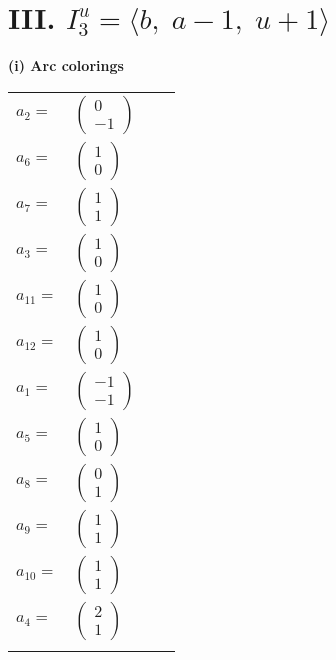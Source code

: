 \documentclass[1p]{elsarticle_modified}
\theoremstyle{definition}
\begin{document}
\centering \section*{III. $I^u_{3}= \langle b,\;a-1,\;u+1 \rangle$}
\flushleft \textbf{(i) Arc colorings}\\
\begin{tabular}{m{7pt} m{180pt} m{7pt} m{180pt} }
\flushright $a_{2}=$&$\begin{pmatrix}0\\-1\end{pmatrix}$ \\
\flushright $a_{6}=$&$\begin{pmatrix}1\\0\end{pmatrix}$ \\
\flushright $a_{7}=$&$\begin{pmatrix}1\\1\end{pmatrix}$ \\
\flushright $a_{3}=$&$\begin{pmatrix}1\\0\end{pmatrix}$ \\
\flushright $a_{11}=$&$\begin{pmatrix}1\\0\end{pmatrix}$ \\
\flushright $a_{12}=$&$\begin{pmatrix}1\\0\end{pmatrix}$ \\
\flushright $a_{1}=$&$\begin{pmatrix}-1\\-1\end{pmatrix}$ \\
\flushright $a_{5}=$&$\begin{pmatrix}1\\0\end{pmatrix}$ \\
\flushright $a_{8}=$&$\begin{pmatrix}0\\1\end{pmatrix}$ \\
\flushright $a_{9}=$&$\begin{pmatrix}1\\1\end{pmatrix}$ \\
\flushright $a_{10}=$&$\begin{pmatrix}1\\1\end{pmatrix}$ \\
\flushright $a_{4}=$&$\begin{pmatrix}2\\1\end{pmatrix}$\\&\end{tabular}
\end{document}
